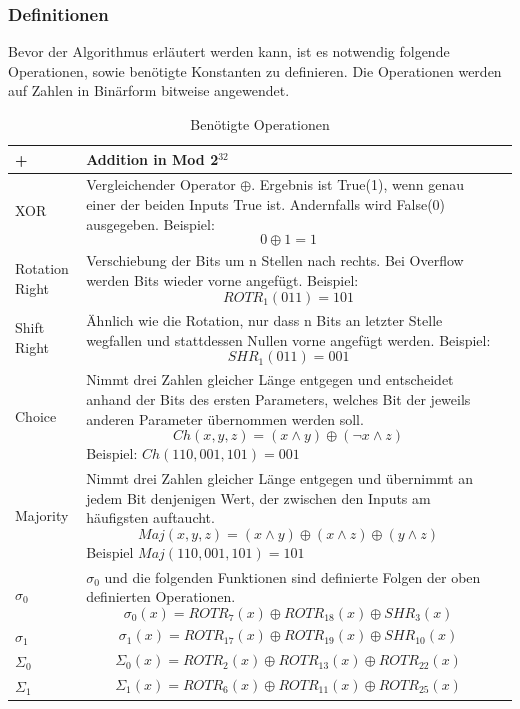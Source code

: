 \subsubsection{Definitionen}
Bevor der Algorithmus erläutert werden kann, ist es notwendig folgende Operationen, sowie benötigte Konstanten zu definieren. Die Operationen werden auf Zahlen in Binärform bitweise angewendet.
\begin{longtable}{p{3.5cm}p{10.5cm}l}
\caption{Benötigte Operationen}
	
		\\\toprule
		+  & Addition in Mod 2$^{32}$
		\\\midrule
		XOR  & Vergleichender Operator $\oplus$. Ergebnis ist True(1), wenn genau einer der beiden Inputs True ist. Andernfalls wird False(0) ausgegeben. Beispiel: $$0 \oplus 1 = 1$$
		\\\midrule
		Rotation Right  & Verschiebung der Bits um n Stellen nach rechts. Bei Overflow werden Bits wieder vorne angefügt. Beispiel: $$ROTR_1(011) = 101$$
		\\\midrule
		Shift Right  & Ähnlich wie die Rotation, nur dass n Bits an letzter Stelle wegfallen und stattdessen Nullen vorne angefügt werden. Beispiel: $$SHR_1(011) = 001$$
		\\\midrule
		Choice  & Nimmt drei Zahlen gleicher Länge entgegen und entscheidet anhand der Bits des ersten Parameters, welches Bit der jeweils anderen Parameter übernommen werden soll. $$Ch(x,y,z) = (x \land y)\oplus(\lnot x \land z)$$
		Beispiel: $Ch(110,001,101) = 001$
		\\\midrule
		Majority  & Nimmt drei Zahlen gleicher Länge entgegen und übernimmt an jedem Bit denjenigen Wert, der zwischen den Inputs am häufigsten auftaucht.
		$$Maj(x,y,z) = (x \land y)\oplus(x \land z)\oplus(y \land z)$$
		Beispiel $Maj(110,001,101) = 101$
		\\\midrule
		$\sigma_0$  & $\sigma_0$ und die folgenden Funktionen sind definierte Folgen der oben definierten Operationen.
		$$\sigma_0(x) = ROTR_7(x) \oplus ROTR_{18}(x) \oplus SHR_3(x)$$ 
		\\\midrule
		$\sigma_1$  & $$\sigma_1(x) = ROTR_{17}(x) \oplus ROTR_{19}(x) \oplus SHR_10(x)$$
		\\\midrule
		$\Sigma_0$  & $$\Sigma_0(x) = ROTR_2(x) \oplus ROTR_{13}(x) \oplus ROTR_{22}(x)$$
		\\\midrule
		$\Sigma_1$  & $$\Sigma_1(x) = ROTR_6(x) \oplus ROTR_{11}(x) \oplus ROTR_{25}(x)$$
		\\\bottomrule
\end{longtable}
